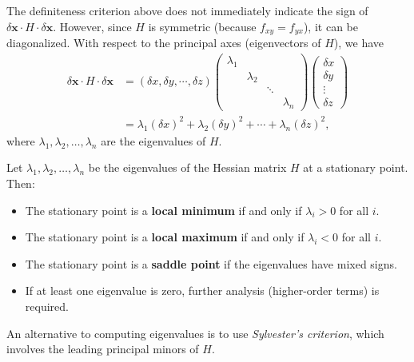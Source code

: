 \documentclass[a4paper]{article}
\begin{document}
\begin{remark}[Diagonalization]
  The definiteness criterion above does not immediately indicate the sign of $\delta \mathbf{x}\cdot H\cdot \delta \mathbf{x}$. However, since $H$ is symmetric (because $f_{xy} = f_{yx}$), it can be diagonalized. With respect to the principal axes (eigenvectors of $H$), we have
  \begin{align*}
    \delta\mathbf{x}\cdot H\cdot \delta\mathbf{x} &= (\delta x, \delta y, \cdots, \delta z)
    \begin{pmatrix}
      \lambda_1\\
      &\lambda_2\\
      &&\ddots\\
      &&&\lambda_n
    \end{pmatrix}
    \begin{pmatrix}
      \delta x\\\delta y\\\vdots\\\delta z
    \end{pmatrix}\\
    &= \lambda_1(\delta x)^2 + \lambda_2 (\delta y)^2 + \cdots + \lambda_n(\delta z)^2,
  \end{align*}
  where $\lambda_1, \lambda_2, \ldots, \lambda_n$ are the eigenvalues of $H$.
\end{remark}

\begin{prop}
  Let $\lambda_1, \lambda_2, \ldots, \lambda_n$ be the eigenvalues of the Hessian matrix $H$ at a stationary point. Then:
  \begin{itemize}
    \item The stationary point is a \textbf{local minimum} if and only if $\lambda_i > 0$ for all $i$.
    \item The stationary point is a \textbf{local maximum} if and only if $\lambda_i < 0$ for all $i$.
    \item The stationary point is a \textbf{saddle point} if the eigenvalues have mixed signs.
    \item If at least one eigenvalue is zero, further analysis (higher-order terms) is required.
  \end{itemize}
\end{prop}

\begin{remark}
  An alternative to computing eigenvalues is to use \emph{Sylvester's criterion}, which involves the leading principal minors of $H$.
\end{remark}
\end{document}

